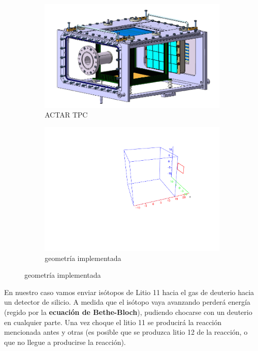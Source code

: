 \documentclass[12pt,a4paper]{article}
\numberwithin{equation}{section}
\numberwithin{figure}{section}
\begin{document}
\begin{figure}[h!] \centering
    \begin{subfigure}[b]{0.45\linewidth} \centering
        \includegraphics[scale=0.55]{actar.png}
        \caption{ACTAR TPC}
        \label{Fig:2.2.01-Lab}
    \end{subfigure}
    \begin{subfigure}[b]{0.45\linewidth} \centering
        \includegraphics[scale=0.4]{geo.pdf}
        \caption{geometría implementada}
        \label{Fig:2.2.01-CM}
    \end{subfigure}
\end{figure}
    

En nuestro caso vamos enviar isótopos de Litio 11 hacia el gas de deuterio hacia un detector de silicio. A medida que el isótopo vaya avanzando perderá energía (regido por la {\bf ecuación de Bethe-Bloch}), pudiendo  chocarse con un deuterio en cualquier parte. Una vez choque el litio 11 se producirá la reacción mencionada antes y otras (es posible que se produzca litio 12 de la reacción, o que no llegue a producirse la reacción). \\
\end{document}
